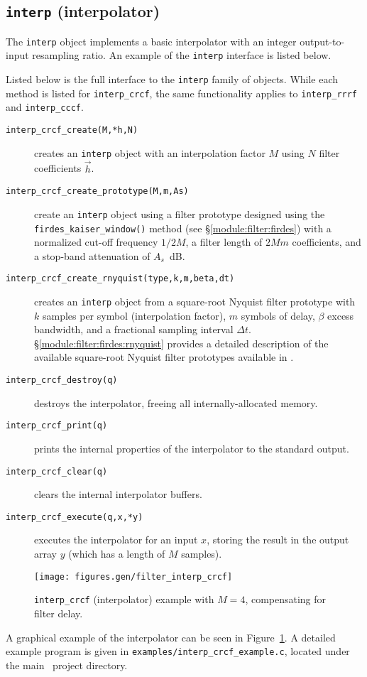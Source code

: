 % 
%
\subsection{{\tt interp} (interpolator)}
\label{module:filter:interp}
The {\tt interp} object implements a basic interpolator with an integer
output-to-input resampling ratio.
An example of the {\tt interp} interface is listed below.
%

%
Listed below is the full interface to the {\tt interp} family of
objects.
While each method is listed for {\tt interp\_crcf}, the same
functionality applies to {\tt interp\_rrrf} and {\tt interp\_cccf}.
%
\begin{description}
\item[{\tt interp\_crcf\_create(M,*h,N)}]
    creates an {\tt interp} object with an interpolation factor $M$
    using $N$ filter coefficients $\vec{h}$.
\item[{\tt interp\_crcf\_create\_prototype(M,m,As)}]
    create an {\tt interp} object using a filter prototype designed
    using the {\tt firdes\_kaiser\_window()} method
    (see \S\ref{module:filter:firdes})
    with a normalized cut-off frequency $1/2M$,
    a filter length of $2Mm$ coefficients,
    and a stop-band attenuation of $A_s$~dB.
\item[{\tt interp\_crcf\_create\_rnyquist(type,k,m,beta,dt)}]
    creates an {\tt interp} object
    from a square-root Nyquist filter prototype with
    $k$ samples per symbol (interpolation factor),
    $m$ symbols of delay,
    $\beta$ excess bandwidth,
    and a fractional sampling interval $\Delta t$.
    \S\ref{module:filter:firdes:rnyquist}
    provides a detailed description of the available square-root Nyquist
    filter prototypes available in \liquid.
\item[{\tt interp\_crcf\_destroy(q)}]
    destroys the interpolator, freeing all internally-allocated memory.
\item[{\tt interp\_crcf\_print(q)}]
    prints the internal properties of the interpolator to the standard
    output.
\item[{\tt interp\_crcf\_clear(q)}]
    clears the internal interpolator buffers.
\item[{\tt interp\_crcf\_execute(q,x,*y)}]
    executes the interpolator for an input $x$, storing the result in
    the output array $y$ (which has a length of $M$ samples).
\end{description}
%
\begin{figure}
\centering
  \texttt{[image: figures.gen/filter\_interp\_crcf]}
\caption{{\tt interp\_crcf} (interpolator) example with $M=4$,
         compensating for filter delay.}
\label{fig:module:filter:interp_crcf}
\end{figure}
%
A graphical example of the interpolator can be seen in
Figure~\ref{fig:module:filter:interp_crcf}.
A detailed example program is given in
{\tt examples/interp\_crcf\_example.c},
located under the main \liquid\ project directory.


